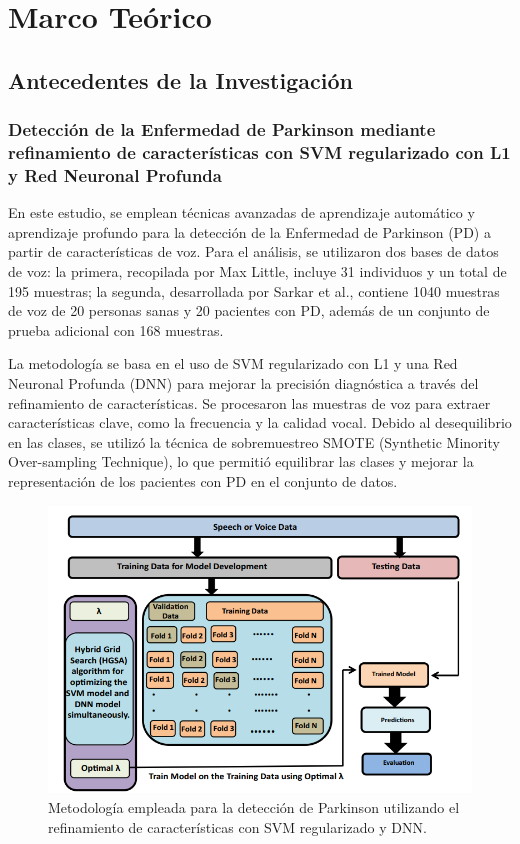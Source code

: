 \documentclass[listof=nochaptergap,12pt,times,authoryear]{report}
\begin{document}
\chapter{Marco Teórico}

\section{Antecedentes de la Investigación}

\subsection{Detección de la Enfermedad de Parkinson mediante refinamiento de características con SVM regularizado con L1 y Red Neuronal Profunda}

En este estudio, se emplean técnicas avanzadas de aprendizaje automático y aprendizaje profundo para la detección de la Enfermedad de Parkinson (PD) a partir de características de voz. Para el análisis, se utilizaron dos bases de datos de voz: la primera, recopilada por Max Little, incluye 31 individuos y un total de 195 muestras; la segunda, desarrollada por Sarkar et al., contiene 1040 muestras de voz de 20 personas sanas y 20 pacientes con PD, además de un conjunto de prueba adicional con 168 muestras.

La metodología se basa en el uso de SVM regularizado con L1 y una Red Neuronal Profunda (DNN) para mejorar la precisión diagnóstica a través del refinamiento de características. Se procesaron las muestras de voz para extraer características clave, como la frecuencia y la calidad vocal. Debido al desequilibrio en las clases, se utilizó la técnica de sobremuestreo SMOTE (Synthetic Minority Over-sampling Technique), lo que permitió equilibrar las clases y mejorar la representación de los pacientes con PD en el conjunto de datos.


\begin{figure}[H]
    \centering
    \includegraphics[width=\textwidth]{A1 - M.png}
    \caption{Metodología empleada para la detección de Parkinson utilizando el refinamiento de características con SVM regularizado y DNN.}
    \label{fig:metodologia}
\end{figure}
\end{document}
